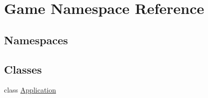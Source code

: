 \hypertarget{namespace_game}{}\section{Game Namespace Reference}
\label{namespace_game}
\subsection*{Namespaces}
\begin{DoxyCompactItemize}
\end{DoxyCompactItemize}
\subsection*{Classes}
\begin{DoxyCompactItemize}
\item 
class \mbox{\hyperlink{class_game_1_1_application}{Application}}
\end{DoxyCompactItemize}
